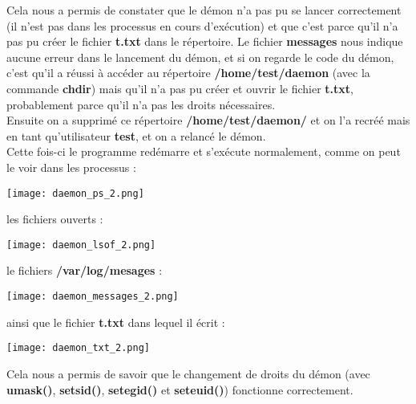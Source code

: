Cela nous a permis de constater que le démon n'a pas pu se lancer correctement (il n'est pas dans les processus en cours d'exécution) et que c'est parce qu'il n'a pas pu créer le fichier \textbf{t.txt} dans le répertoire. Le fichier \textbf{messages} nous indique aucune erreur dans le lancement du démon, et si on regarde le code du démon, c'est qu'il a réussi à accéder au répertoire \textbf{/home/test/daemon} (avec la commande \textbf{chdir}) mais qu'il n'a pas pu créer et ouvrir le fichier \textbf{t.txt}, probablement parce qu'il n'a pas les droits nécessaires.\\

Ensuite on a supprimé ce répertoire \textbf{/home/test/daemon/} et on l'a recréé mais en tant qu'utilisateur \textbf{test}, et on a relancé le démon.\\

Cette fois-ci le programme redémarre et s'exécute normalement, comme on peut le voir dans les processus :

\begin{center} 
\hspace{15cm}
\texttt{[image: daemon\_ps\_2.png]}
\end{center}
\vspace{0.5cm}

les fichiers ouverts :

\begin{center} 
\hspace{15cm}
\texttt{[image: daemon\_lsof\_2.png]}
\end{center}
\vspace{0.5cm}

le fichiers \textbf{/var/log/mesages} :

\begin{center} 
\hspace{15cm}
\texttt{[image: daemon\_messages\_2.png]}
\end{center}
\vspace{0.5cm}

ainsi que le fichier \textbf{t.txt} dans lequel il écrit :

\begin{center} 
\hspace{15cm}
\texttt{[image: daemon\_txt\_2.png]}
\end{center}
\vspace{0.5cm}

Cela nous a permis de savoir que le changement de droits du démon (avec \textbf{umask()}, \textbf{setsid()}, \textbf{setegid()} et \textbf{seteuid()}) fonctionne correctement.

